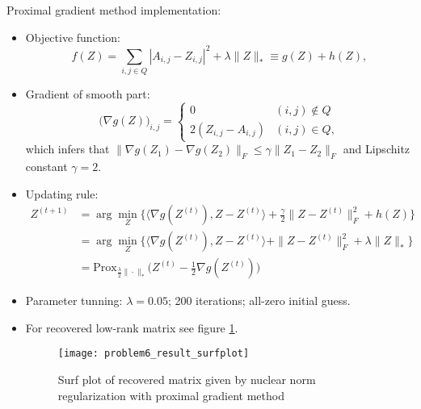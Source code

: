 \documentclass{article}
\begin{document}
\begin{myproof}[3.]
  Proximal gradient method implementation:
	\begin{itemize}
		\item Objective function:
		  \begin{equation}
		  f(Z) = \sum_{i,j\in Q}|A_{i,j}-Z_{i,j}|^2+\lambda\|Z\|_\ast\equiv g(Z)+h(Z),
		  \end{equation}
		\item Gradient of smooth part:
		  \begin{equation}
		  \big(\nabla g(Z)\big)_{i,j}=
		  \begin{cases}
		  0 & (i,j)\not\in Q \\
		  2(Z_{i,j}-A_{i,j}) & (i,j)\in Q,
		  \end{cases}
		  \end{equation}
		  which infers that
		  $ \|\nabla g(Z_1)-\nabla g(Z_2)\|_F \leq \gamma\|Z_1-Z_2\|_F$
		  and Lipschitz constant $\gamma=2$.
		\item Updating rule:
		  \begin{align}
		  Z^{(t+1)} &= \arg \min_Z \Big\{ \langle\nabla g(Z^{(t)}), Z-Z^{(t)}\rangle + \frac{\gamma}{2}\|Z-Z^{(t)}\|_F^2+h(Z)\Big\}\\
		            &= \arg \min_Z \Big\{ \langle\nabla g(Z^{(t)}), Z-Z^{(t)}\rangle+\|Z-Z^{(t)}\|_F^2+\lambda \|Z\|_\ast\Big\}\\
		            &= \mbox{Prox}_{\frac{\lambda}{2}\|\cdot\|_\ast}\Big(Z^{(t)}-\frac{1}{2}\nabla g(Z^{(t)})\Big)
		  \end{align}
    \item Parameter tunning: $\lambda = 0.05$; 200 iterations; all-zero initial guess.
    \item For recovered low-rank matrix see figure \ref{fig:problem6resultsurfplot}.
    \begin{figure}[!h]
    	\centering
    	\texttt{[image: problem6\_result\_surfplot]}
    	\caption{Surf plot of recovered matrix given by nuclear norm regularization with proximal gradient method}
    	\label{fig:problem6resultsurfplot}
    \end{figure}
	\end{itemize}
\end{myproof}
\end{document}

